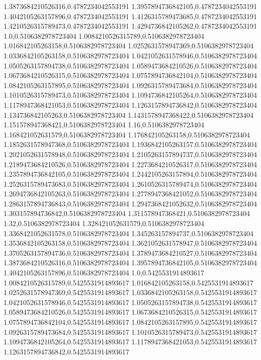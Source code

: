 1.3873684210526316,0.4787234042553191
1.3957894736842105,0.4787234042553191
1.4042105263157896,0.4787234042553191
1.4126315789473685,0.4787234042553191
1.4210526315789473,0.4787234042553191
1.4294736842105262,0.4787234042553191
1.0,0.5106382978723404
1.0084210526315789,0.5106382978723404
1.016842105263158,0.5106382978723404
1.0252631578947369,0.5106382978723404
1.0336842105263158,0.5106382978723404
1.0421052631578946,0.5106382978723404
1.0505263157894738,0.5106382978723404
1.0589473684210526,0.5106382978723404
1.0673684210526315,0.5106382978723404
1.0757894736842104,0.5106382978723404
1.0842105263157895,0.5106382978723404
1.0926315789473684,0.5106382978723404
1.1010526315789473,0.5106382978723404
1.1094736842105264,0.5106382978723404
1.1178947368421053,0.5106382978723404
1.1263157894736842,0.5106382978723404
1.134736842105263,0.5106382978723404
1.1431578947368422,0.5106382978723404
1.151578947368421,0.5106382978723404
1.16,0.5106382978723404
1.168421052631579,0.5106382978723404
1.176842105263158,0.5106382978723404
1.1852631578947368,0.5106382978723404
1.1936842105263157,0.5106382978723404
1.2021052631578948,0.5106382978723404
1.2105263157894737,0.5106382978723404
1.2189473684210526,0.5106382978723404
1.2273684210526317,0.5106382978723404
1.2357894736842105,0.5106382978723404
1.2442105263157894,0.5106382978723404
1.2526315789473683,0.5106382978723404
1.2610526315789474,0.5106382978723404
1.2694736842105263,0.5106382978723404
1.2778947368421052,0.5106382978723404
1.2863157894736843,0.5106382978723404
1.2947368421052632,0.5106382978723404
1.303157894736842,0.5106382978723404
1.311578947368421,0.5106382978723404
1.32,0.5106382978723404
1.328421052631579,0.5106382978723404
1.3368421052631578,0.5106382978723404
1.345263157894737,0.5106382978723404
1.3536842105263158,0.5106382978723404
1.3621052631578947,0.5106382978723404
1.3705263157894736,0.5106382978723404
1.3789473684210527,0.5106382978723404
1.3873684210526316,0.5106382978723404
1.3957894736842105,0.5106382978723404
1.4042105263157896,0.5106382978723404
1.0,0.5425531914893617
1.0084210526315789,0.5425531914893617
1.016842105263158,0.5425531914893617
1.0252631578947369,0.5425531914893617
1.0336842105263158,0.5425531914893617
1.0421052631578946,0.5425531914893617
1.0505263157894738,0.5425531914893617
1.0589473684210526,0.5425531914893617
1.0673684210526315,0.5425531914893617
1.0757894736842104,0.5425531914893617
1.0842105263157895,0.5425531914893617
1.0926315789473684,0.5425531914893617
1.1010526315789473,0.5425531914893617
1.1094736842105264,0.5425531914893617
1.1178947368421053,0.5425531914893617
1.1263157894736842,0.5425531914893617
